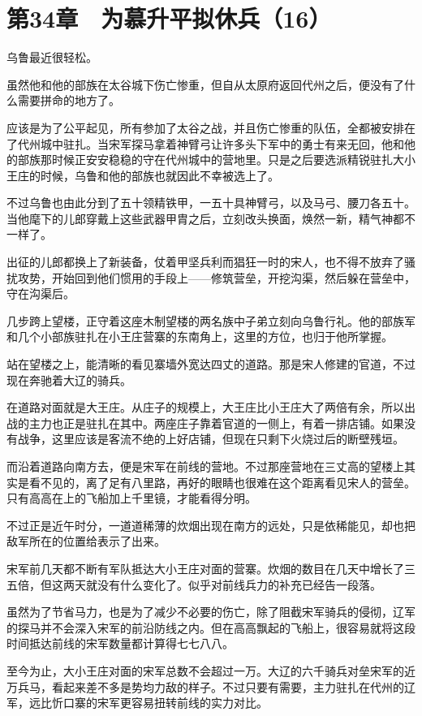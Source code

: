 \section{第34章　为慕升平拟休兵（16）}

乌鲁最近很轻松。

虽然他和他的部族在太谷城下伤亡惨重，但自从太原府返回代州之后，便没有了什么需要拼命的地方了。

应该是为了公平起见，所有参加了太谷之战，并且伤亡惨重的队伍，全都被安排在了代州城中驻扎。当宋军探马拿着神臂弓让许多头下军中的勇士有来无回，他和他的部族那时候正安安稳稳的守在代州城中的营地里。只是之后要选派精锐驻扎大小王庄的时候，乌鲁和他的部族也就因此不幸被选上了。

不过乌鲁也由此分到了五十领精铁甲，一五十具神臂弓，以及马弓、腰刀各五十。当他麾下的儿郎穿戴上这些武器甲胄之后，立刻改头换面，焕然一新，精气神都不一样了。

出征的儿郎都换上了新装备，仗着甲坚兵利而猖狂一时的宋人，也不得不放弃了骚扰攻势，开始回到他们惯用的手段上——修筑营垒，开挖沟渠，然后躲在营垒中，守在沟渠后。

几步跨上望楼，正守着这座木制望楼的两名族中子弟立刻向乌鲁行礼。他的部族军和几个小部族驻扎在小王庄营寨的东南角上，这里的方位，也归于他所掌握。

站在望楼之上，能清晰的看见寨墙外宽达四丈的道路。那是宋人修建的官道，不过现在奔驰着大辽的骑兵。

在道路对面就是大王庄。从庄子的规模上，大王庄比小王庄大了两倍有余，所以出战的主力也正是驻扎在其中。两座庄子靠着官道的一侧上，有着一排店铺。如果没有战争，这里应该是客流不绝的上好店铺，但现在只剩下火烧过后的断壁残垣。

而沿着道路向南方去，便是宋军在前线的营地。不过那座营地在三丈高的望楼上其实是看不见的，离了足有八里路，再好的眼睛也很难在这个距离看见宋人的营垒。只有高高在上的飞船加上千里镜，才能看得分明。

不过正是近午时分，一道道稀薄的炊烟出现在南方的远处，只是依稀能见，却也把敌军所在的位置给表示了出来。

宋军前几天都不断有军队抵达大小王庄对面的营寨。炊烟的数目在几天中增长了三五倍，但这两天就没有什么变化了。似乎对前线兵力的补充已经告一段落。

虽然为了节省马力，也是为了减少不必要的伤亡，除了阻截宋军骑兵的侵彻，辽军的探马并不会深入宋军的前沿防线之内。但在高高飘起的飞船上，很容易就将这段时间抵达前线的宋军数量都计算得七七八八。

至今为止，大小王庄对面的宋军总数不会超过一万。大辽的六千骑兵对垒宋军的近万兵马，看起来差不多是势均力敌的样子。不过只要有需要，主力驻扎在代州的辽军，远比忻口寨的宋军更容易扭转前线的实力对比。

